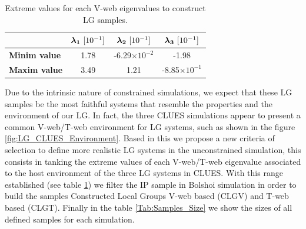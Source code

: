 \documentclass[usenatbib]{latex/mn2e}
\begin{document}
\begin{table}
  \centering
  \begin{tabular}{l | c c c} \hline
	& $\boldsymbol{ \lambda_{1} }\ [10^{-1}]$ & $\boldsymbol{ \lambda_{2} }\ [10^{-1}]$  & $\boldsymbol{ \lambda_{3} }\ [10^{-1}]$ \\ \hline
	\textbf{Minim value} & 1.78 & -6.29$\times 10^{-2}$ & -1.98 \\
	\textbf{Maxim value} & 3.49 & 1.21 & -8.85$\times 10^{-1}$ \\ \hline
  \end{tabular}
  
  \caption{Extreme values for each V-web eigenvalues to construct LG 
  samples.}
  
  \label{Tab:Lambdas_LG}
\end{table}



Due to the intrinsic nature of constrained simulations, we expect that 
these LG samples be the most faithful systems that resemble the properties
and the environment of our LG. In fact, the three CLUES simulations appear 
to present a common V-web/T-web environment for LG systems, such as shown 
in the figure \ref{fig:LG_CLUES_Environment}. Based in this we propose a 
new criteria of selection to define more realistic LG systems in the
unconstrained simulation, this consists in tanking the extreme values of 
each V-web/T-web eigenvalue associated to the host environment of the three 
LG systems in CLUES. With this range established (see table 
\ref{Tab:Lambdas_LG}) we filter the IP sample in Bolshoi simulation in 
order to build the samples Constructed Local Groups V-web based (CLGV) 
and T-web based (CLGT). Finally in the table \ref{Tab:Samples_Size} we 
show the sizes of all defined samples for each simulation.
\end{document}
